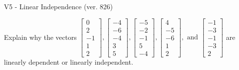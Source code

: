 \begin{exercise}
  \begin{exerciseTitle}V5 - Linear Independence (ver. 826)\end{exerciseTitle}
  \begin{exerciseStatement}
    Explain why the vectors \(\left[\begin{array}{r}
0 \\
2 \\
-1 \\
1 \\
2
\end{array}\right] , \left[\begin{array}{r}
-4 \\
-6 \\
-4 \\
3 \\
5
\end{array}\right] , \left[\begin{array}{r}
-5 \\
-2 \\
-1 \\
5 \\
-4
\end{array}\right] , \left[\begin{array}{r}
4 \\
-5 \\
-6 \\
1 \\
2
\end{array}\right] , \text{ and } \left[\begin{array}{r}
-1 \\
-3 \\
-1 \\
-3 \\
2
\end{array}\right]\) are linearly dependent or linearly independent.	



\end{exerciseStatement}
\end{exercise}
